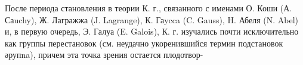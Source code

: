 \documentclass[10pt]{article}
\begin{document}
После периода становления в теории К. г., связанного с именами О. Коши (А. Саuchy), Ж. Лагражжа (J. Lagrange), К. Гаycca (C. Gauss), H. Абеля (N. Abel) и, в первую очередь, Э. Галуа (E. Galois), К. г. изучались почти исключительно как группы перестановок (см. неудачно укоренившийся термин подстановок әрупna), причем эта точка зрения остается плодотвор-
\end{document}
